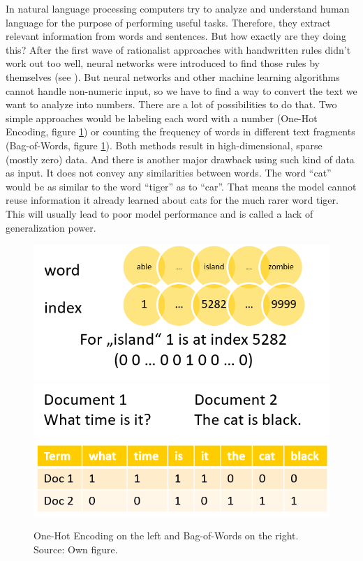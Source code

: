 \documentclass[]{krantz}
\begin{document}
In natural language processing computers try to analyze and understand human language for the purpose of performing useful tasks. Therefore, they extract relevant information from words and sentences. But how exactly are they doing this? After the first wave of rationalist approaches with handwritten rules didn't work out too well, neural networks were introduced to find those rules by themselves (see \citet{Bengio.2003}). But neural networks and other machine learning algorithms cannot handle non-numeric input, so we have to find a way to convert the text we want to analyze into numbers.
There are a lot of possibilities to do that. Two simple approaches would be labeling each word with a number (One-Hot Encoding, figure \ref{fig:onehot-bow}) or counting the frequency of words in different text fragments (Bag-of-Words, figure \ref{fig:onehot-bow}). Both methods result in high-dimensional, sparse (mostly zero) data. And there is another major drawback using such kind of data as input. It does not convey any similarities between words. The word ``cat'' would be as similar to the word ``tiger'' as to ``car''. That means the model cannot reuse information it already learned about cats for the much rarer word tiger. This will usually lead to poor model performance and is called a lack of generalization power.

\begin{figure}
\includegraphics[width=0.5\linewidth]{figures/01-00-deep-learning-for-nlp/01-01_one-hot} \includegraphics[width=0.5\linewidth]{figures/01-00-deep-learning-for-nlp/01-01_bow} \caption{One-Hot Encoding on the left and Bag-of-Words on the right. Source: Own figure.}\label{fig:onehot-bow}
\end{figure}
\end{document}
